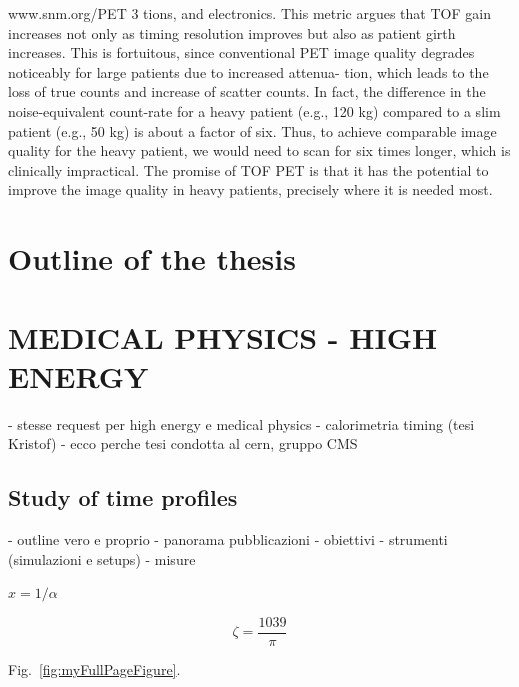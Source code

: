 www.snm.org/PET
3
tions, and electronics. This metric argues that TOF gain increases
not only as timing resolution improves but also as patient girth
increases. This is fortuitous, since conventional PET image quality
degrades noticeably for large patients due to increased attenua-
tion, which leads to the loss of true counts and increase of scatter
counts. In fact, the difference in the noise-equivalent count-rate
for a heavy patient (e.g., 120 kg) compared to a slim patient (e.g.,
50 kg) is about a factor of six. Thus, to achieve comparable image
quality for the heavy patient, we would need to scan for six times
longer, which is clinically impractical. The promise of TOF PET
is that it has the potential to improve the image quality in heavy
patients, precisely where it is needed most. 

\section{Outline of the thesis}
\section{MEDICAL PHYSICS - HIGH ENERGY}
- stesse request per high energy e medical physics
- calorimetria timing (tesi Kristof)
- ecco perche tesi condotta al cern, gruppo CMS
\subsection{Study of time profiles}
- outline vero e proprio
	- panorama pubblicazioni
	- obiettivi
	- strumenti (simulazioni e setups)
	- misure

$x = 1/\alpha$ 

$$\zeta = \frac{1039}{\pi}$$

Fig.~\ref{fig:myFullPageFigure}.


\afterpage{\clearpage}


